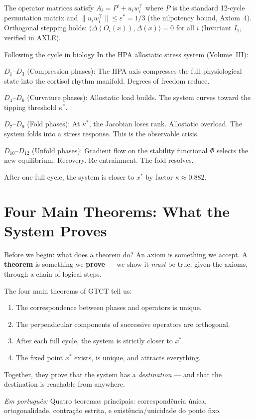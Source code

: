 \documentclass[12pt, openright]{book}
\theoremstyle{definition}
\theoremstyle{remark}
\begin{document}
\medskip

The operator matrices satisfy $A_i = P^i + u_i w_i^\top$
where $P$ is the standard 12-cycle permutation matrix and
$\|u_i w_i^\top\| \leq \varepsilon^* = 1/3$ (the nilpotency bound,
Axiom~4). Orthogonal stepping holds: $\langle\Delta(O_i(x)),\Delta(x)\rangle = 0$
for all $i$ (Invariant $I_1$, verified in AXLE).

\begin{examplebox}{Following the cycle in biology}
In the HPA allostatic stress system (Volume~III):

$D_1$--$D_3$ (Compression phases): The HPA axis compresses the
full physiological state into the cortisol rhythm manifold.
Degrees of freedom reduce.

$D_4$--$D_6$ (Curvature phases): Allostatic load builds.
The system curves toward the tipping threshold $\kappa^*$.

$D_7$--$D_9$ (Fold phases): At $\kappa^*$, the Jacobian loses rank.
Allostatic overload. The system folds into a stress response.
This is the observable crisis.

$D_{10}$--$D_{12}$ (Unfold phases): Gradient flow on the stability
functional $\Phi$ selects the new equilibrium.
Recovery. Re-entrainment. The fold resolves.

After one full cycle, the system is closer to $x^*$ by factor $\kappa \approx 0.882$.
\end{examplebox}

\chapter{Four Main Theorems: What the System Proves}
\label{ch:theorems}

\begin{studentbox}{Before we begin: what does a theorem do?}
An axiom is something we accept. A \textbf{theorem} is something
we \textbf{prove} --- we show it \textit{must} be true, given
the axioms, through a chain of logical steps.

The four main theorems of GTCT tell us:
\begin{enumerate}
\item The correspondence between phases and operators is unique.
\item The perpendicular components of successive operators are orthogonal.
\item After each full cycle, the system is strictly closer to $x^*$.
\item The fixed point $x^*$ exists, is unique, and attracts everything.
\end{enumerate}

Together, they prove that the system has a \textit{destination} ---
and that the destination is reachable from anywhere.

\textit{Em português:}
Quatro teoremas principais: correspondência única, ortogonalidade,
contração estrita, e existência/unicidade do ponto fixo.
\end{studentbox}
\end{document}
